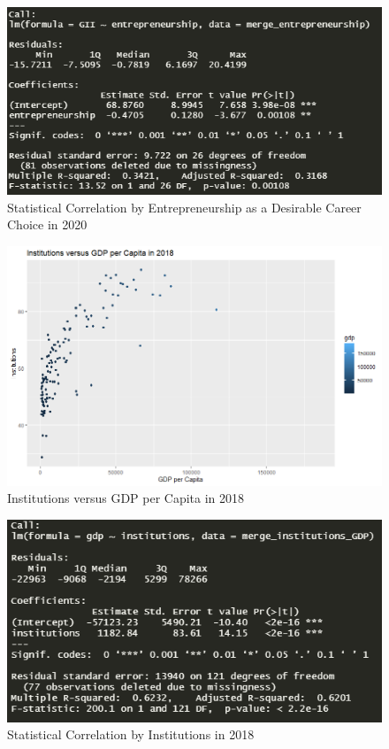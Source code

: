 \documentclass[15pt]{article}
\begin{document}
\begin{figure}[H]
    \centering
    \includegraphics[scale = 0.7]{Part5_Entrepreneurship_r^2.PNG}
    \caption{Statistical Correlation by Entrepreneurship as a Desirable Career Choice in 2020}
\end{figure}

\begin{figure}[H]
    \centering
    \includegraphics[scale = 0.7]{Part5_Institutions_GDP.png}
    \caption{Institutions versus GDP per Capita in 2018}
\end{figure}

\begin{figure}[H]
    \centering
    \includegraphics[scale = 0.7]{Part5_Institutions_GDP_r^2.PNG}
    \caption{Statistical Correlation by Institutions in 2018}
\end{figure}
\end{document}
